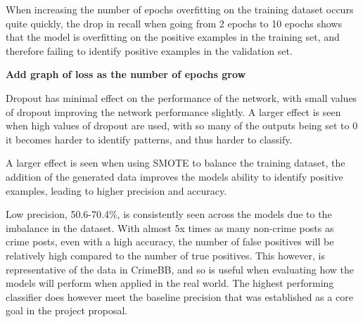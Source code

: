\documentclass[12pt,a4paper,twoside,openright]{report}
\begin{document}
When increasing the number of epochs overfitting on the training dataset occurs quite quickly, the drop in recall when going from 2 epochs to 10 epochs shows that the model is overfitting on the positive examples in the training set, and therefore failing to identify positive examples in the validation set. 

\textbf{Add graph of loss as the number of epochs grow}

Dropout has minimal effect on the performance of the network, with small values of dropout improving the network performance slightly. A larger effect is seen when high values of dropout are used, with so many of the outputs being set to 0 it becomes harder to identify patterns, and thus harder to classify.

A larger effect is seen when using SMOTE to balance the training dataset, the addition of the generated data improves the models ability to identify positive examples, leading to higher precision and accuracy.

Low precision, 50.6-70.4\%, is consistently seen across the models due to the imbalance in the dataset. With almost 5x times as many non-crime posts as crime posts, even with a high accuracy, the number of false positives will be relatively high compared to the number of true positives. This however, is representative of the data in CrimeBB, and so is useful when evaluating how the models will perform when applied in the real world. The highest performing classifier does however meet the baseline precision that was established as a core goal in the project proposal.

\end{document}
